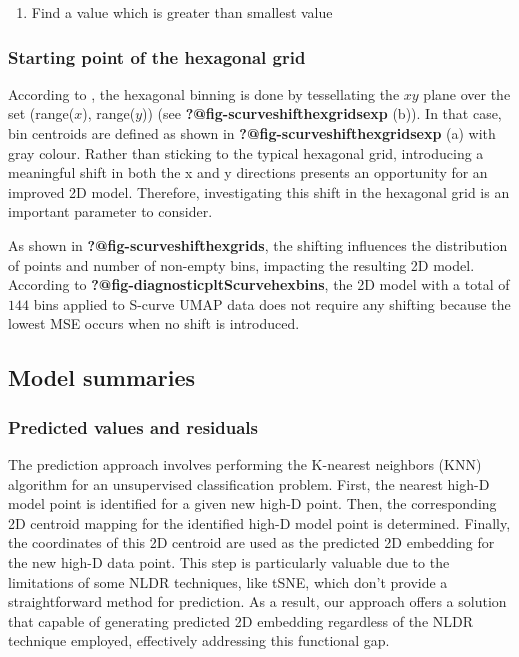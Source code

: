 \documentclass[
  12pt]{article}
\providecommand{\tightlist}{%
  \setlength{\itemsep}{0pt}\setlength{\parskip}{0pt}}\usepackage{longtable,booktabs,array}
\begin{document}
\begin{enumerate}
\def\labelenumi{\arabic{enumi}.}
\setcounter{enumi}{1}
\tightlist
\item
  Find a value which is greater than smallest value
\end{enumerate}

\hypertarget{starting-point-of-the-hexagonal-grid}{%
\subsubsection{Starting point of the hexagonal
grid}\label{starting-point-of-the-hexagonal-grid}}

According to \citet{Dan2023}, the hexagonal binning is done by
tessellating the \(xy\) plane over the set (range(\(x\)), range(\(y\)))
(see \textbf{?@fig-scurveshifthexgridsexp} (b)). In that case, bin
centroids are defined as shown in \textbf{?@fig-scurveshifthexgridsexp}
(a) with gray colour. Rather than sticking to the typical hexagonal
grid, introducing a meaningful shift in both the x and y directions
presents an opportunity for an improved 2D model. Therefore,
investigating this shift in the hexagonal grid is an important parameter
to consider.

As shown in \textbf{?@fig-scurveshifthexgrids}, the shifting influences
the distribution of points and number of non-empty bins, impacting the
resulting 2D model. According to
\textbf{?@fig-diagnosticpltScurvehexbins}, the 2D model with a total of
\(144\) bins applied to S-curve UMAP data does not require any shifting
because the lowest MSE occurs when no shift is introduced.

\hypertarget{sec-summary}{%
\subsection{Model summaries}\label{sec-summary}}

\hypertarget{predicted-values-and-residuals}{%
\subsubsection{Predicted values and
residuals}\label{predicted-values-and-residuals}}

The prediction approach involves performing the K-nearest neighbors
(KNN) algorithm for an unsupervised classification problem. First, the
nearest high-D model point is identified for a given new high-D point.
Then, the corresponding 2D centroid mapping for the identified high-D
model point is determined. Finally, the coordinates of this 2D centroid
are used as the predicted 2D embedding for the new high-D data point.
This step is particularly valuable due to the limitations of some NLDR
techniques, like tSNE, which don't provide a straightforward method for
prediction. As a result, our approach offers a solution that capable of
generating predicted 2D embedding regardless of the NLDR technique
employed, effectively addressing this functional gap.
\end{document}
